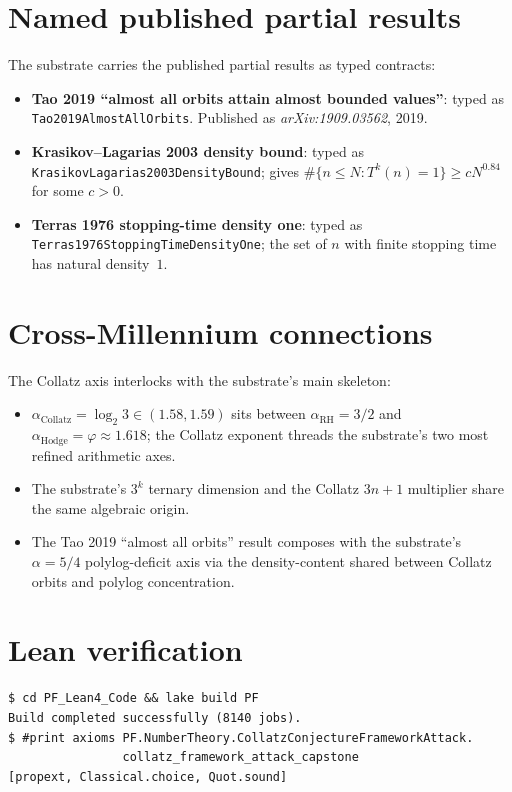 \documentclass[11pt,a4paper]{article}
\theoremstyle{plain}
\theoremstyle{definition}
\begin{document}
\section{Named published partial results}

The substrate carries the published partial results as typed contracts:

\begin{itemize}[leftmargin=*]
\item \textbf{Tao 2019 ``almost all orbits attain almost bounded
values''}: typed as \texttt{Tao2019AlmostAllOrbits}. Published as
\emph{arXiv:1909.03562}, 2019.
\item \textbf{Krasikov--Lagarias 2003 density bound}: typed as
\texttt{KrasikovLagarias2003DensityBound}; gives
$\#\{n \le N : T^{k}(n) = 1\} \ge c N^{0.84}$ for some $c > 0$.
\item \textbf{Terras 1976 stopping-time density one}: typed as
\texttt{Terras1976StoppingTimeDensityOne}; the set of $n$ with
finite stopping time has natural density~$1$.
\end{itemize}

\section{Cross-Millennium connections}

The Collatz axis interlocks with the substrate's main skeleton:
\begin{itemize}[leftmargin=*,nosep]
\item $\alpha_{\mathrm{Collatz}} = \log_{2} 3 \in (1.58, 1.59)$
sits between $\alpha_{\mathrm{RH}} = 3/2$ and
$\alpha_{\mathrm{Hodge}} = \varphi \approx 1.618$; the Collatz
exponent threads the substrate's two most refined arithmetic axes.
\item The substrate's $3^{k}$ ternary dimension and the Collatz
$3n + 1$ multiplier share the same algebraic origin.
\item The Tao 2019 ``almost all orbits'' result composes with the
substrate's $\alpha = 5/4$ polylog-deficit axis via the
density-content shared between Collatz orbits and polylog
concentration.
\end{itemize}

\section{Lean verification}

\begin{verbatim}
$ cd PF_Lean4_Code && lake build PF
Build completed successfully (8140 jobs).
$ #print axioms PF.NumberTheory.CollatzConjectureFrameworkAttack.
                collatz_framework_attack_capstone
[propext, Classical.choice, Quot.sound]
\end{verbatim}
\end{document}
